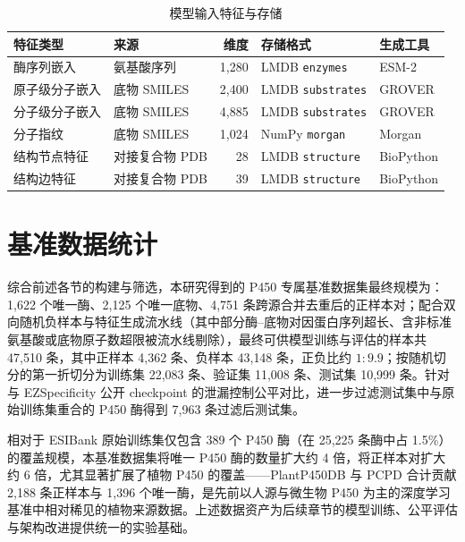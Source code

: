 \begin{table}[htbp]
  \centering
  \caption{模型输入特征与存储}
  \label{tab:ch3-features}
  \small
  \begin{tabular*}{\textwidth}{@{\extracolsep{\fill}}llrll}
    \toprule
    特征类型 & 来源 & 维度 & 存储格式 & 生成工具 \\
    \midrule
    酶序列嵌入     & 氨基酸序列     & 1{,}280 & LMDB \texttt{enzymes}    & ESM-2\cite{ESM2023} \\
    原子级分子嵌入 & 底物 SMILES    & 2{,}400 & LMDB \texttt{substrates} & GROVER\cite{GROVER2020} \\
    分子级分子嵌入 & 底物 SMILES    & 4{,}885 & LMDB \texttt{substrates} & GROVER\cite{GROVER2020} \\
    分子指纹       & 底物 SMILES    & 1{,}024 & NumPy \texttt{morgan}    & Morgan\cite{ECFP2010} \\
    结构节点特征   & 对接复合物 PDB & 28      & LMDB \texttt{structure}  & BioPython \\
    结构边特征     & 对接复合物 PDB & 39      & LMDB \texttt{structure}  & BioPython \\
    \bottomrule
  \end{tabular*}
\end{table}

\section{基准数据统计}
\label{sec:stats}

综合前述各节的构建与筛选，本研究得到的 P450 专属基准数据集最终规模为：1{,}622 个唯一酶、2{,}125 个唯一底物、4{,}751 条跨源合并去重后的正样本对；配合双向随机负样本与特征生成流水线（其中部分酶--底物对因蛋白序列超长、含非标准氨基酸或底物原子数超限被流水线剔除），最终可供模型训练与评估的样本共 47{,}510 条，其中正样本 4{,}362 条、负样本 43{,}148 条，正负比约 $1:9.9$；按随机切分的第一折切分为训练集 22{,}083 条、验证集 11{,}008 条、测试集 10{,}999 条。针对与 EZSpecificity 公开 checkpoint 的泄漏控制公平对比，进一步过滤测试集中与原始训练集重合的 P450 酶得到 7{,}963 条过滤后测试集。

相对于 ESIBank 原始训练集仅包含 389 个 P450 酶（在 25{,}225 条酶中占 1.5\%）的覆盖规模，本基准数据集将唯一 P450 酶的数量扩大约 4 倍，将正样本对扩大约 6 倍，尤其显著扩展了植物 P450 的覆盖——PlantP450DB 与 PCPD 合计贡献 2{,}188 条正样本与 1{,}396 个唯一酶，是先前以人源与微生物 P450 为主的深度学习基准中相对稀见的植物来源数据。上述数据资产为后续章节的模型训练、公平评估与架构改进提供统一的实验基础。
